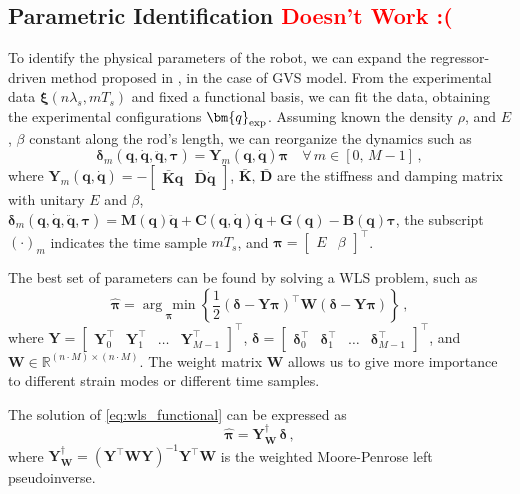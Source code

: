 \subsection{Parametric Identification \textcolor{red}{Doesn't Work :(}}
To identify the physical parameters of the robot, we can expand the regressor-driven method proposed in \cite{stella2022experimental}, in the case of \ac{GVS} model. From the experimental data $\bm{\xi}(n \lambda_s, m T_s)$ and fixed a functional basis, we can fit the data, obtaining the experimental configurations $\bm{q}_{\textnormal{exp}}$. Assuming known the density $\rho$, and $E$, $\beta$ constant along the rod's length, we can reorganize the dynamics such as
\begin{equation} \label{eq:regressor}
    \bm{\delta}_m\left(\bm{q}, \dot{\bm{q}}, \ddot{\bm{q}}, \bm{\tau}\right) = \bm{Y}_m\left(\bm{q}, \dot{\bm{q}}\right) \bm{\pi} \quad \forall \, m \in [0, \, M - 1] \, ,
\end{equation}
where $\bm{Y}_m\left(\bm{q}, \dot{\bm{q}}\right) = - \begin{bmatrix}\bar{\bm{K}}\bm{q} & \bar{\bm{D}}\dot{\bm{q}}\end{bmatrix}$, $\bar{\bm{K}} , \, \bar{\bm{D}}$ are the stiffness and damping matrix with unitary $E$ and $\beta$, $\bm{\delta}_m\left(\bm{q}, \dot{\bm{q}}, \ddot{\bm{q}}, \bm{\tau}\right) = \bm{M}\left(\bm{q}\right) \ddot{\bm{q}} + \bm{C}\left(\bm{q}, \dot{\bm{q}}\right) \dot{\bm{q}} + \bm{G}\left(\bm{q}\right) - \bm{B}\left(\bm{q}\right) \bm{\tau}$, the subscript $\left(\cdot\right)_{m}$ indicates the time sample $m T_s$, and $\bm{\pi} = \begin{bmatrix}
    E & \beta
\end{bmatrix}^{\top}$.

The best set of parameters can be found by solving a \ac{WLS} problem, such as
\begin{equation} \label{eq:wls_functional}
    \hat{\bm{\pi}} = \underset{\bm{\pi}}{\arg \, \min} \left\{\frac{1}{2}\left(\bm{\delta} - \bm{Y}\bm{\pi}\right)^{\top} \bm{W} \left(\bm{\delta} - \bm{Y}\bm{\pi}\right)\right\} \, ,
\end{equation}
where $\bm{Y} = \begin{bmatrix} \bm{Y}^{\top}_0 & \bm{Y}^{\top}_{1} & \dots & \bm{Y}^{\top}_{M - 1} \end{bmatrix}^{\top}$, $\bm{\delta} = \begin{bmatrix} \bm{\delta}^{\top}_0 & \bm{\delta}^{\top}_{1} & \dots & \bm{\delta}^{\top}_{M - 1} \end{bmatrix}^{\top}$, and $\bm{W} \in \mathbb{R}^{\left(n \cdot M\right) \times \left(n \cdot M\right)}$. The weight matrix $\bm{W}$ allows us to give more importance to different strain modes or different time samples.

The solution of \eqref{eq:wls_functional} can be expressed as
\begin{equation} \label{eq:wsl_identification}
    \hat{\bm{\pi}} = \bm{Y}^{\dagger}_{\bm{W}} \, \bm{\delta} \, ,
\end{equation}
where $\bm{Y}^{\dagger}_{\bm{W}} = \left(\bm{Y}^{\top} \bm{W} \bm{Y}\right)^{-1} \bm{Y}^{\top} \bm{W}$ is the weighted Moore-Penrose left pseudoinverse.